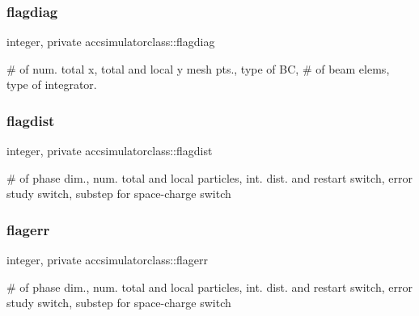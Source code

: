 \subsubsection{\texorpdfstring{flagdiag}{flagdiag}}
{\footnotesize\ttfamily integer, private accsimulatorclass\+::flagdiag\hspace{0.3cm}{\ttfamily [private]}}



\# of num. total x, total and local y mesh pts., type of BC, \# of beam elems, type of integrator. 

\mbox{\label{namespaceaccsimulatorclass_a487e5f5861f9d6613a37837a38e8a2c0}} 
\subsubsection{\texorpdfstring{flagdist}{flagdist}}
{\footnotesize\ttfamily integer, private accsimulatorclass\+::flagdist\hspace{0.3cm}{\ttfamily [private]}}



\# of phase dim., num. total and local particles, int. dist. and restart switch, error study switch, substep for space-\/charge switch 

\mbox{\label{namespaceaccsimulatorclass_aeed14cf632798f53deb7a49d73f7d09f}} 
\subsubsection{\texorpdfstring{flagerr}{flagerr}}
{\footnotesize\ttfamily integer, private accsimulatorclass\+::flagerr\hspace{0.3cm}{\ttfamily [private]}}



\# of phase dim., num. total and local particles, int. dist. and restart switch, error study switch, substep for space-\/charge switch 

\mbox{\label{namespaceaccsimulatorclass_aeb76c7474e39b4748e1f18d5c44b63ce}} 
